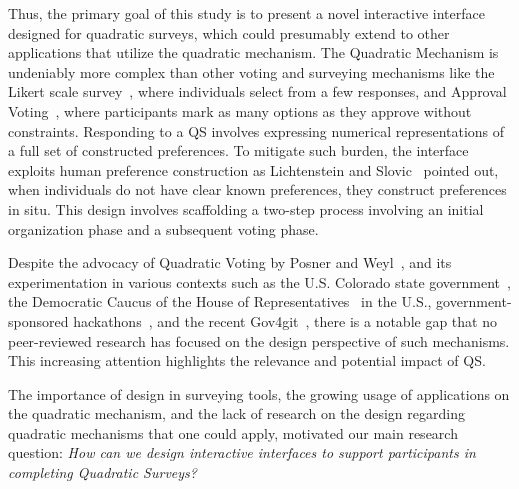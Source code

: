 Thus, the primary goal of this study is to present a novel interactive interface designed for quadratic surveys, which could presumably extend to other applications that utilize the quadratic mechanism. The Quadratic Mechanism is undeniably more complex than other voting and surveying mechanisms like the Likert scale survey~\cite{likertTechniqueMeasurementAttitudes1932}, where individuals select from a few responses, and Approval Voting~\cite{bramsApprovalVoting1978}, where participants mark as many options as they approve without constraints. Responding to a QS involves expressing numerical representations of a full set of constructed preferences. To mitigate such burden, the interface exploits human preference construction as Lichtenstein and Slovic~\cite{lichtensteinConstructionPreference2006} pointed out, when individuals do not have clear known preferences, they construct preferences in situ. This design involves scaffolding a two-step process involving an initial organization phase and a subsequent voting phase. 

Despite the advocacy of Quadratic Voting by Posner and Weyl~\cite{posner2018radical}, and its experimentation in various contexts such as the U.S. Colorado state government~\cite{ColoradoTriedNew}, the Democratic Caucus of the House of Representatives~\cite{QuadraticVotingColorado} in the U.S., government-sponsored hackathons~\cite{teamTaiwanDigitalMinister}, and the recent Gov4git~\cite{Gov4gitDecentralizedPlatform2023}, there is a notable gap that no peer-reviewed research has focused on the design perspective of such mechanisms. This increasing attention highlights the relevance and potential impact of QS. 

The importance of design in surveying tools, the growing usage of applications on the quadratic mechanism, and the lack of research on the design regarding quadratic mechanisms that one could apply, motivated our main research question: \textit{How can we design interactive interfaces to support participants in completing Quadratic Surveys?}

